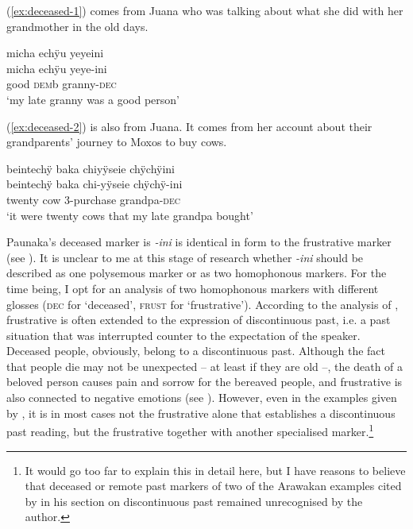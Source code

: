 (\ref{ex:deceased-1}) comes from Juana who was talking about what she did with her grandmother in the old days.

\ea\label{ex:deceased-1}
\begingl
\glpreamble micha echÿu yeyeini\\
\gla micha echÿu yeye-ini\\
\glb good \textsc{dem}b granny-\textsc{dec}\\
\glft ‘my late granny was a good person’
\endgl
\trailingcitation{[jxx-p120430l-1.059]}
\xe

(\ref{ex:deceased-2}) is also from Juana. It comes from her account about their grandparents’ journey to Moxos to buy cows.

\ea\label{ex:deceased-2}
\begingl 
\glpreamble beintechÿ baka chiyÿseie chÿchÿini\\
\gla beintechÿ baka chi-yÿseie chÿchÿ-ini\\ 
\glb twenty cow 3-purchase grandpa-\textsc{dec}\\ 
\glft ‘it were twenty cows that my late grandpa bought’\\ 
\endgl
\trailingcitation{[jxx-p151016l-2.081-083]}
\xe
{} 


 Paunaka’s deceased marker is \textit{-ini} is identical in form to the frustrative marker (see ). It is unclear to me at this stage of research whether \textit{-ini} should be described as one polysemous marker or as two homophonous markers. For the time being, I opt for an analysis of two homophonous markers with different glosses (\textsc{dec} for ‘deceased’, \textsc{frust} for ‘frustrative’).
According to the analysis of \citet[490--491]{Overall2017}, frustrative is often extended to the expression of discontinuous past, i.e. a past situation that was interrupted counter to the expectation of the speaker. Deceased people, obviously, belong to a discontinuous past. Although the fact that people die may not be unexpected – at least if they are old –, the death of a beloved person causes pain and sorrow for the bereaved people, and frustrative is also connected to negative emotions (see ). However, even in the examples given by  \citet[490--492]{Overall2017}, it is in most cases not the frustrative alone that establishes a discontinuous past reading, but the frustrative together with another specialised marker.\footnote{It would go too far to explain this in detail here, but I have reasons to believe that deceased or remote past markers of two of the Arawakan examples cited by \citet[]{Overall2017} in his section on discontinuous past remained unrecognised by the author.}  %

